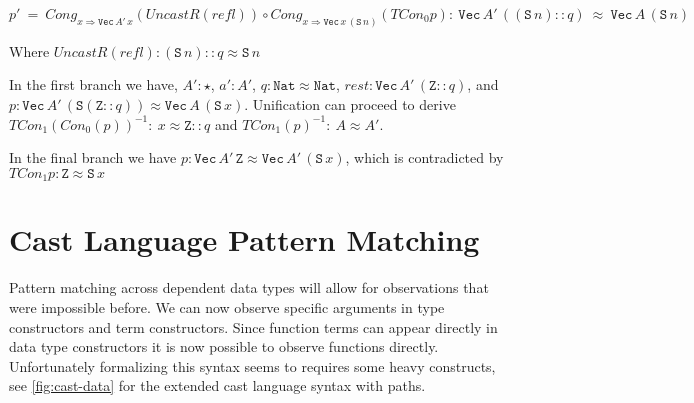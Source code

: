 $p'\ =\ Cong_{x\Rightarrow \mathtt{Vec}\,A'\,x}\left(UncastR\left(refl\right)\right)\circ Cong_{x\Rightarrow \mathtt{Vec}\,x\,\left(\mathtt{S}\,n\right)}\left(TCon_{0}p\right):\ \mathtt{Vec}\,A'\,\left(\left(\mathtt{S}\,n\right)::q\right)\ \approx\ \mathtt{Vec}\,A\,\left(\mathtt{S}\,n\right)$

Where 
$UncastR\left(refl\right): \left(\mathtt{S}\,n\right)::q  \approx \mathtt{S}\,n $

In the first branch we have, 
  $A':\star$, $a':A'$,
  $q:\mathtt{Nat}\approx \mathtt{Nat}$,
  $rest:\mathtt{Vec}\,A'\,\left(\mathtt{Z}::q\right)$, 
  and $p:\mathtt{Vec}\,A'\,\left(\mathtt{S}\left(\mathtt{Z}::q\right)\right)\approx \mathtt{Vec}\,A\,\left(\mathtt{S}\,x\right)$.
Unification can proceed to derive $TCon_{1}\left(Con_{0}\left(p\right)\right)^{-1}:\ x\approx \mathtt{Z}::q$
and $TCon_{1}\left(p\right)^{-1}:\ A\approx A'$.

In the final branch we have $p:\mathtt{Vec}\,A'\,\mathtt{Z}\approx \mathtt{Vec}\,A'\,\left(\mathtt{S}\,x\right)$,
which is contradicted by $TCon_{1}p:\mathtt{Z}\approx \mathtt{S}\,x$


\section{Cast Language Pattern Matching}

Pattern matching across dependent data types will allow for observations that were impossible before.
We can now observe specific arguments in type constructors and term constructors.
Since function terms can appear directly in data type constructors it is now possible to observe functions directly.
Unfortunately formalizing this syntax seems to requires some heavy constructs, see \ref{fig:cast-data} for the extended cast language syntax with paths. 


